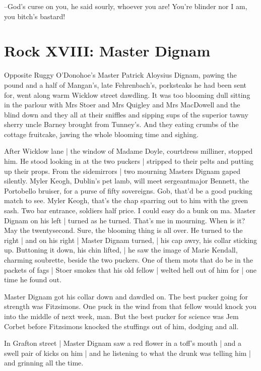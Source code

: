 --God's curse on you,
he said sourly,
whoever you are!
You're blinder nor I am,
you bitch's bastard!


\section*{Rock XVIII: Master Dignam}


Opposite Ruggy O'Donohoe's
Master Patrick Aloysius Dignam,
pawing the pound and a half of Mangan's,
late Fehrenbach's,
porksteaks he
had been sent for,
went along warm Wicklow street dawdling.
It was too
blooming dull sitting in the parlour
with Mrs Stoer and Mrs Quigley and
Mrs MacDowell
and the blind down
and they all at their sniffles
and
sipping sups of the superior tawny sherry
uncle Barney brought from
Tunney's.
And they eating crumbs of the cottage fruitcake,
jawing the
whole blooming time and sighing.

After Wicklow lane |
the window of Madame Doyle, courtdress milliner,
stopped him.
He stood looking in at the two puckers |
stripped to their pelts and putting up their props.
From the sidemirrors |
two mourning Masters Dignam gaped silently.
Myler Keogh, Dublin's pet lamb,
will meet sergeantmajor Bennett, the Portobello bruiser,
for a purse of fifty sovereigns.
Gob, that'd be a good pucking match to see.
Myler Keogh, that's the chap sparring out to him with the green sash.
Two bar entrance, soldiers half price.
I could easy do a bunk on ma.
Master Dignam on his left |
turned as he turned.
That's me in mourning.
When is it?
May the twentysecond.
Sure, the blooming thing is all over.
He turned to the right |
and on his right |
Master Dignam turned, |
his cap awry, his collar sticking up.
Buttoning it down, his chin lifted, |
he saw the image of Marie Kendall, charming soubrette,
beside the two puckers.
One of them mots that do be in the packets of fags |
Stoer smokes that his old fellow |
welted hell out of him for |
one time he found out.

Master Dignam got his collar down and dawdled on.
The best pucker
going for strength was Fitzsimons.
One puck in the wind from that fellow
would knock you into the middle of next week, man.
But the best pucker
for science
was Jem Corbet
before Fitzsimons knocked the stuffings out of
him,
dodging and all.

In Grafton street |
Master Dignam saw a red flower in a toff's mouth |
and a swell pair of kicks on him |
and he listening to what the drunk was telling him |
and grinning all the time.


